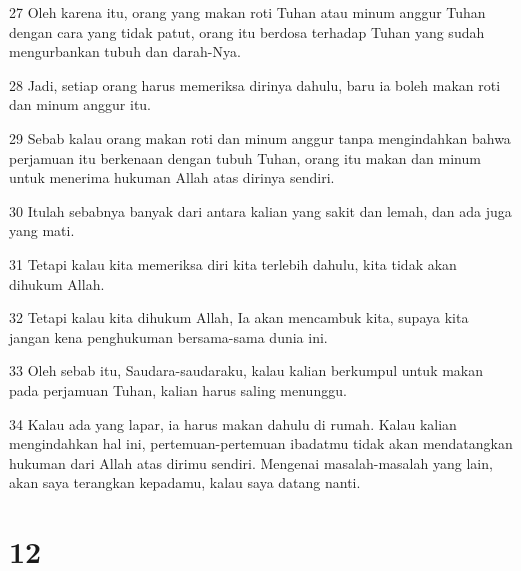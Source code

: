 \par 27 Oleh karena itu, orang yang makan roti Tuhan atau minum anggur Tuhan dengan cara yang tidak patut, orang itu berdosa terhadap Tuhan yang sudah mengurbankan tubuh dan darah-Nya.
\par 28 Jadi, setiap orang harus memeriksa dirinya dahulu, baru ia boleh makan roti dan minum anggur itu.
\par 29 Sebab kalau orang makan roti dan minum anggur tanpa mengindahkan bahwa perjamuan itu berkenaan dengan tubuh Tuhan, orang itu makan dan minum untuk menerima hukuman Allah atas dirinya sendiri.
\par 30 Itulah sebabnya banyak dari antara kalian yang sakit dan lemah, dan ada juga yang mati.
\par 31 Tetapi kalau kita memeriksa diri kita terlebih dahulu, kita tidak akan dihukum Allah.
\par 32 Tetapi kalau kita dihukum Allah, Ia akan mencambuk kita, supaya kita jangan kena penghukuman bersama-sama dunia ini.
\par 33 Oleh sebab itu, Saudara-saudaraku, kalau kalian berkumpul untuk makan pada perjamuan Tuhan, kalian harus saling menunggu.
\par 34 Kalau ada yang lapar, ia harus makan dahulu di rumah. Kalau kalian mengindahkan hal ini, pertemuan-pertemuan ibadatmu tidak akan mendatangkan hukuman dari Allah atas dirimu sendiri. Mengenai masalah-masalah yang lain, akan saya terangkan kepadamu, kalau saya datang nanti.

\chapter{12}

